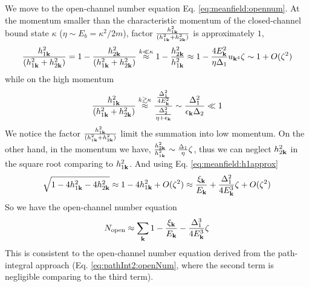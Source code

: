 We move to the open-channel number equation Eq. \ref{eq:meanfield:opennum}.  At the momentum smaller than the characteristic momentum of the closed-channel bound state $\kappa$  ($\eta\sim{}E_{b}=\kappa^{2}/2m$), factor $\frac{ h_{1\mathbf{k}}^2}{( h_{1\mathbf{k}}^2+ h_{2\mathbf{k}}^2)} $ is approximately $1$,
\begin{equation*}
\frac{ h_{1\mathbf{k}}^2}{( h_{1\mathbf{k}}^2+ h_{2\mathbf{k}}^2)} =1-\frac{h_{2\mathbf{k}}^2}{( h_{1\mathbf{k}}^2+ h_{2\mathbf{k}}^2)}
\overset{k\ll{}\kappa}\approx1-\frac{h_{2\mathbf{k}}^2}{h_{1\mathbf{k}}^2}
\approx1-\frac{4E_{\mathbf{k}}^{2}}{\eta\Delta_{1}}u_{\mathbf{k}^{4}}\zeta
\sim1+O(\zeta^{2})
\end{equation*}
while on the high momentum 
\begin{equation*}
\frac{ h_{1\mathbf{k}}^2}{( h_{1\mathbf{k}}^2+ h_{2\mathbf{k}}^2)}
\overset{k\gtrsim\kappa}\approx\frac{\frac{\Delta_{1}^{2}}{4E_{\mathbf{k}}^{2}}}{\frac{\Delta_{2}^{2}}{\eta+\epsilon_{\mathbf{k}}}}
\sim\frac{\Delta_{1}^{2}}{\epsilon_{\mathbf{k}}\Delta_{2}}\ll1
\end{equation*}
We notice the factor $\frac{ h_{1\mathbf{k}}^2}{( h_{1\mathbf{k}}^2+ h_{2\mathbf{k}}^2)} $ limit the summation into  low momentum.  On the other hand, in the momentum we have, $\frac{h_{2\mathbf{k}}^{2}}{h_{1\mathbf{k}}^{2}}\sim\frac{\Delta_{1}}{\eta}\zeta$, thus we can neglect $h_{2\mathbf{k}}^{2}$ in the square root comparing to $h_{1\mathbf{k}}^{2}$. And using Eq. \ref{eq:meanfield:h1approx}
\begin{equation*}
\sqrt{1-4 h_{1\mathbf{k}}^2-4 h_{2\mathbf{k}}^2}\approx1-4h_{1\mathbf{k}}^{2}+O({\zeta}^{2})
	\approx\frac{\xi_{\mathbf{k}}}{E_{\mathbf{k}}}+\frac{\Delta_{1}^{2}}{4E_{\mathbf{k}}^{3}}\zeta+O({\zeta}^{2})
\end{equation*}
So we have the open-channel number equation 
\begin{equation}
N_{\text{open}}\approx\sum_{\mathbf{k}}1-\frac{\xi_{\mathbf{k}}}{E_{\mathbf{k}}}-\frac{\Delta_{1}^{3}}{4E_{\mathbf{k}}^{3}}\zeta
\end{equation}
This is consistent to the open-channel number equation derived from the path-integral approach  (Eq. \ref{eq:pathInt2:openNum}, where the second term is negligible comparing to the third term).


